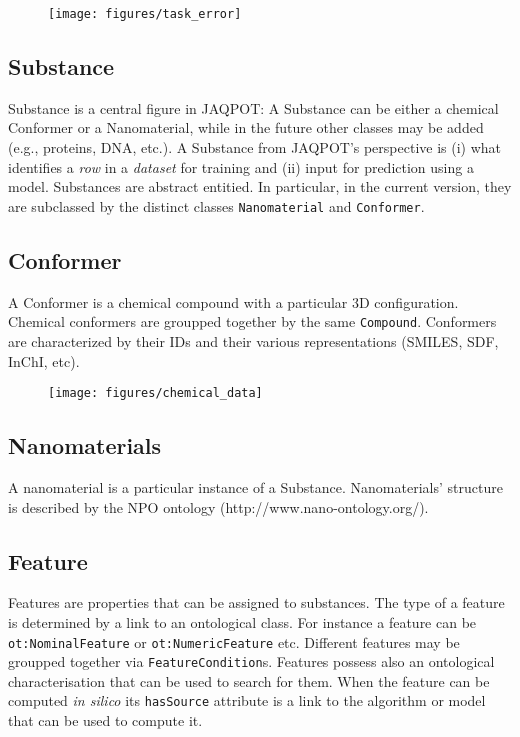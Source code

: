 \begin{figure}[h]
 \centering
 \texttt{[image: figures/task\_error]}
\end{figure}


\subsection{Substance}
Substance is a central figure in JAQPOT: A Substance can be either a
chemical Conformer or a Nanomaterial, while in the future other classes
may be added (e.g., proteins, DNA, etc.). A Substance from JAQPOT's
perspective is (i) what identifies a \textit{row} in a \textit{dataset} for
training and (ii) input for prediction using a model.
Substances are abstract entitied. In particular, in the current version, they
are subclassed by the distinct classes \texttt{Nanomaterial} and \texttt{Conformer}.

\subsection{Conformer}
A Conformer is a chemical compound with a particular 3D configuration.
Chemical conformers are groupped together by the same \texttt{Compound}.
Conformers are characterized by their IDs and their various representations
(SMILES, SDF, InChI, etc).

\begin{figure}[h]
 \centering
 \texttt{[image: figures/chemical\_data]}
\end{figure}

\subsection{Nanomaterials}
A nanomaterial is a particular instance of a Substance. Nanomaterials'
structure is described by the NPO ontology (http://www.nano-ontology.org/).



\subsection{Feature}
Features are properties that can be assigned to substances. The type of
a feature is determined by a link to an ontological class. For instance
a feature can be \texttt{ot:NominalFeature} or \texttt{ot:NumericFeature}
etc. Different features may be groupped together via \texttt{FeatureCondition}s.
Features possess also an ontological characterisation that can be 
used to search for them. When the feature can be computed \textit{in silico}
its \texttt{hasSource} attribute
is a link to the algorithm or model that can be used to compute it.


